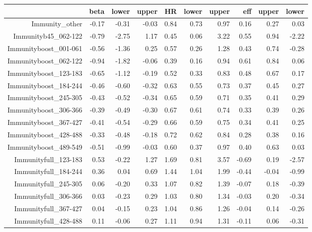 \begin{table}[ht]
\centering
\begin{tabular}{rrrrrrrrrr}
  \hline
 & beta & lower & upper & HR & lower & upper & eff & upper & lower \\ 
  \hline
Immunity\_other & -0.17 & -0.31 & -0.03 & 0.84 & 0.73 & 0.97 & 0.16 & 0.27 & 0.03 \\ 
  Immunityb45\_062-122 & -0.79 & -2.75 & 1.17 & 0.45 & 0.06 & 3.22 & 0.55 & 0.94 & -2.22 \\ 
  Immunityboost\_001-061 & -0.56 & -1.36 & 0.25 & 0.57 & 0.26 & 1.28 & 0.43 & 0.74 & -0.28 \\ 
  Immunityboost\_062-122 & -0.94 & -1.82 & -0.06 & 0.39 & 0.16 & 0.94 & 0.61 & 0.84 & 0.06 \\ 
  Immunityboost\_123-183 & -0.65 & -1.12 & -0.19 & 0.52 & 0.33 & 0.83 & 0.48 & 0.67 & 0.17 \\ 
  Immunityboost\_184-244 & -0.46 & -0.60 & -0.32 & 0.63 & 0.55 & 0.73 & 0.37 & 0.45 & 0.27 \\ 
  Immunityboost\_245-305 & -0.43 & -0.52 & -0.34 & 0.65 & 0.59 & 0.71 & 0.35 & 0.41 & 0.29 \\ 
  Immunityboost\_306-366 & -0.39 & -0.49 & -0.30 & 0.67 & 0.61 & 0.74 & 0.33 & 0.39 & 0.26 \\ 
  Immunityboost\_367-427 & -0.41 & -0.54 & -0.29 & 0.66 & 0.59 & 0.75 & 0.34 & 0.41 & 0.25 \\ 
  Immunityboost\_428-488 & -0.33 & -0.48 & -0.18 & 0.72 & 0.62 & 0.84 & 0.28 & 0.38 & 0.16 \\ 
  Immunityboost\_489-549 & -0.51 & -0.99 & -0.03 & 0.60 & 0.37 & 0.97 & 0.40 & 0.63 & 0.03 \\ 
  Immunityfull\_123-183 & 0.53 & -0.22 & 1.27 & 1.69 & 0.81 & 3.57 & -0.69 & 0.19 & -2.57 \\ 
  Immunityfull\_184-244 & 0.36 & 0.04 & 0.69 & 1.44 & 1.04 & 1.99 & -0.44 & -0.04 & -0.99 \\ 
  Immunityfull\_245-305 & 0.06 & -0.20 & 0.33 & 1.07 & 0.82 & 1.39 & -0.07 & 0.18 & -0.39 \\ 
  Immunityfull\_306-366 & 0.03 & -0.23 & 0.29 & 1.03 & 0.80 & 1.34 & -0.03 & 0.20 & -0.34 \\ 
  Immunityfull\_367-427 & 0.04 & -0.15 & 0.23 & 1.04 & 0.86 & 1.26 & -0.04 & 0.14 & -0.26 \\ 
  Immunityfull\_428-488 & 0.11 & -0.06 & 0.27 & 1.11 & 0.94 & 1.31 & -0.11 & 0.06 & -0.31 \\ 

\end{tabular}
\end{table}
